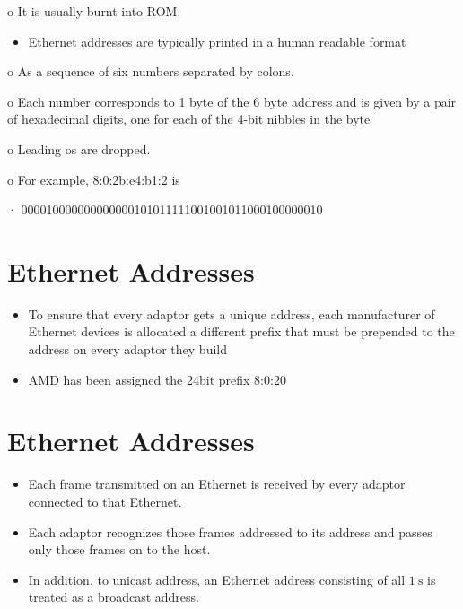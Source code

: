 \documentclass[10pt]{article}
\begin{document}
o It is usually burnt into ROM.

\begin{itemize}
  \item Ethernet addresses are typically printed in a human readable format
\end{itemize}

o As a sequence of six numbers separated by colons.

o Each number corresponds to 1 byte of the 6 byte address and is given by a pair of hexadecimal digits, one for each of the 4-bit nibbles in the byte

o Leading os are dropped.

o For example, 8:0:2b:e4:b1:2 is

· 000010000000000000101011111001001011000100000010

\section{Ethernet Addresses}
\begin{itemize}
  \item To ensure that every adaptor gets a unique address, each manufacturer of Ethernet devices is allocated a different prefix that must be prepended to the address on every adaptor they build
\end{itemize}

\begin{itemize}
  \item AMD has been assigned the 24bit prefix 8:0:20
\end{itemize}

\section{Ethernet Addresses}
\begin{itemize}
  \item Each frame transmitted on an Ethernet is received by every adaptor connected to that Ethernet.

  \item Each adaptor recognizes those frames addressed to its address and passes only those frames on to the host.

  \item In addition, to unicast address, an Ethernet address consisting of all $1 \mathrm{~s}$ is treated as a broadcast address.

\end{itemize}
\end{document}
